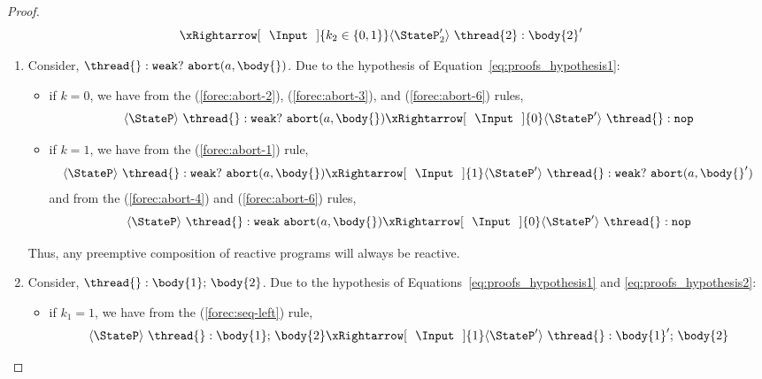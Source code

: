 \begin{proof}
\begin{align}
		&	\xRightarrow[~~\Input~~]{k_2 \in \{0, 1\}} 
		\langle \StateP_2' \rangle ~ \thread{2}:\body{2}'
	\end{align}
	\begin{enumerate}
		\item Consider, $\thread{}:\mathtt{weak}?~\mathtt{abort}(a, \body{})$. 
			  Due to the hypothesis of Equation~\ref{eq:proofs_hypothesis1}:
			  \begin{itemize}
				\item if $k = 0$, we have from the (\ref{forec:abort-2}), 
					  (\ref{forec:abort-3}), and (\ref{forec:abort-6}) rules, 
					  \begin{equation*}
						\langle \StateP \rangle ~ \thread{}:\mathtt{weak}?~\mathtt{abort}(a, \body{}) 
							\xRightarrow[~~\Input~~]{0} 
						\langle \StateP' \rangle ~ \thread{}:\mathtt{nop}
					  \end{equation*}
		
				\item if $k = 1$, we have from the (\ref{forec:abort-1}) rule, 
					  \begin{equation*}
						\langle \StateP \rangle ~ \thread{}:\mathtt{weak}?~\mathtt{abort}(a, \body{}) 
							\xRightarrow[~~\Input~~]{1} 
						\langle \StateP' \rangle ~ \thread{}:\mathtt{weak}?~\mathtt{abort}(a, \body{}')
					  \end{equation*}
					  and from the (\ref{forec:abort-4}) and (\ref{forec:abort-6}) rules, 
					  \begin{equation*}
						\langle \StateP \rangle ~ \thread{}:\mathtt{weak}~\mathtt{abort}(a, \body{}) 
							\xRightarrow[~~\Input~~]{0} 
						\langle \StateP' \rangle ~ \thread{}:\mathtt{nop}
					  \end{equation*}
			  \end{itemize}
			  Thus, any preemptive composition of reactive programs will always be reactive.

		\item Consider, $\thread{}:\body{1}\mathtt{;}~\body{2}$. 
			  Due to the hypothesis of Equations~\ref{eq:proofs_hypothesis1} and \ref{eq:proofs_hypothesis2}:
			  \begin{itemize}
				\item if $k_1 = 1$, we have from the (\ref{forec:seq-left}) rule,
					  \begin{equation*}
			  		  	\langle \StateP \rangle ~ \thread{}:\body{1}\mathtt{;}~\body{2}
			  		  		\xRightarrow[~~\Input~~]{1} 
						\langle \StateP' \rangle ~ \thread{}:\body{1}'\mathtt{;}~\body{2}
			  		  \end{equation*}


\end{itemize}
\end{enumerate}
\end{proof}
